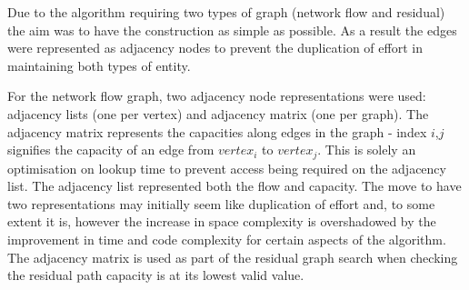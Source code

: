 Due to the algorithm requiring two types of graph (network flow and residual)
the aim was to have the construction as simple as possible. As a result the
edges were represented as adjacency nodes to prevent the duplication of effort
in maintaining both types of entity.

For the network flow graph, two adjacency node representations were used:
adjacency lists (one per vertex) and adjacency matrix (one per graph). The
adjacency matrix represents the capacities along edges in the graph -
index $i$,$j$ signifies the capacity of an edge from $vertex_i$ to
$vertex_j$. This is solely an optimisation on lookup time to prevent
access being required on the adjacency list. The adjacency list represented both
the flow and capacity. The move to have two representations may initially seem
like duplication of effort and, to some extent it is, however the increase in
space complexity is overshadowed by the improvement in time and code complexity
for certain aspects of the algorithm. The adjacency matrix is used as part of
the residual graph search when checking the residual path capacity is at its
lowest valid value.
